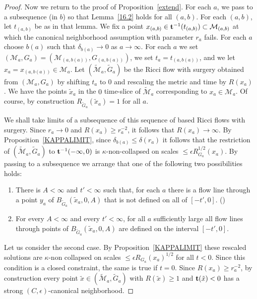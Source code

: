 \begin{proof}
Now we return to the proof of Proposition~\ref{extend}. For each $a$, we pass
to a subsequence (in $b$) so that Lemma~\ref{16.2} holds for all $(a,b)$. For
each $(a,b)$, let $t_{(a,b)}$ be as in that lemma.  We fix a point
$x_{(a,b)}\in {\bf t}^{-1}(t_{(a,b)})\subset {\mathcal M}_{(a,b)}$ at which the
canonical neighborhood assumption with parameter $r_a$ fails.  For each $a$
choose $b(a)$ such that $\delta_{b(a)}\rightarrow 0$ as $a\rightarrow \infty$. For each
$a$ we set $({\mathcal M}_a,G_a)=({\mathcal M}_{(a,b(a))},G_{(a,b(a))})$, we
set $t_a=t_{(a,b(a))}$, and we let $x_a=x_{(a,b(a))}\in {\mathcal M}_a$. Let
$(\widetilde {\mathcal M}_a,\widetilde G_a)$ be the Ricci flow with surgery
obtained from $({\mathcal M}_a,G_a)$ by shifting $t_a$ to $0$ and rescaling the
metric and time by $R(x_a)$. We have the points $\tilde x_a$ in the $0$
time-slice of $\widetilde {\mathcal M}_a$ corresponding to $x_a\in {\mathcal
M}_a$. Of course, by construction $R_{\widetilde G_a}(\tilde x_a)=1$ for all
$a$.

We shall take limits of a subsequence of this sequence of based
Ricci flows with surgery. Since $r_a\rightarrow 0$ and $R(x_a)\ge
r_a^{-2}$, it follows that $R(x_a)\rightarrow \infty$. By
Proposition~\ref{KAPPALIMIT}, since $\delta_{b(a)}\le \delta(r_a)$
it follows that the restriction of $(\widetilde {\mathcal
M}_a,\widetilde G_a)$ to ${\bf t}^{-1}(-\infty,0)$ is
$\kappa$-non-collapsed on scales $\le \epsilon R_{G_a}^{1/2}(x_a)$.
By passing to a subsequence we arrange that one of the following two
possibilities holds:
\begin{enumerate}
\item[(i)] There is $A<\infty$ and $t'<\infty$ such that,
for each $a$ there is a flow line through a point $y_a$ of $B_{\widetilde
G_a}(\tilde x_a,0,A)$ that is not defined on all of $[-t',0]$. ()
\item[(ii)] For every $A<\infty$ and every $t'<\infty$, for all $a$
sufficiently large all flow lines through points of $B_{\widetilde
G_a}(\tilde x_a,0,A)$ are defined on the interval $[-t', 0]$.
\end{enumerate}




Let us consider the second case. By Proposition~\ref{KAPPALIMIT}
these rescaled solutions are $\kappa$-non collapsed on scales $\le
\epsilon R_{G_a}(x_a)^{1/2}$ for all $t<0$. Since this condition is
a closed constraint, the same is true if $t=0$. Since $R(x_a)\ge
r_a^{-2}$, by construction every point $\tilde
x\in(\widetilde{\mathcal M}_a,\widetilde G_a)$ with $R(\tilde x)\ge
1$ and ${\bf t}(\tilde x)<0$ has a strong $(C,\epsilon)$-canonical
neighborhood.


\end{proof}
